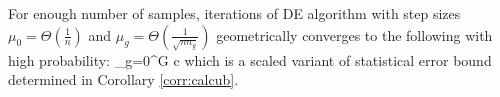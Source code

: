 \begin{corollary}
	\label{corr:show}
	For enough number of samples, iterations of DE algorithm with step sizes $\mu_0 = \Theta(\frac{1}{n})$ and $\mu_g =  \Theta(\frac{1}{\sqrt{n n_g}})$ geometrically converges to the following with high probability:
	{\small\be
	\label{eq:scaled}
	\sum_{g=0}^{G}  
	\leq c 
	\ee}
	which is a scaled variant of statistical error bound determined in Corollary \ref{corr:calcub}.
\end{corollary}
%
%

